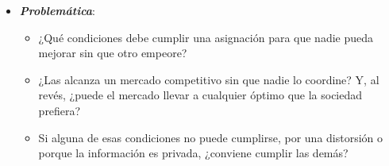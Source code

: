 \documentclass[11pt]{article}
\begin{document}
\begin{itemize}
\begin{itemize}
\begin{itemize}
    \item En los años 50, \textcite{LipseyLancaster1956General} formalizan el \emph{second best}, anticipado por \textcite{Meade1955Trade}, y desde los 70~la economía de la información (, ) muestra los límites de los teoremas cuando la información es privada.\footnote{ recibió el Premio Nobel de Economía en 1977, con , «por su contribución pionera a la teoría del comercio internacional y de los movimientos internacionales de capital»\nocite{Nobel1977MeadeOhlin}; , en 1996, con , «por sus contribuciones fundamentales a la teoría económica de los incentivos con información asimétrica»\nocite{Nobel1996MirrleesVickrey}, y , en 2007, con  y , «por haber sentado las bases de la teoría del diseño de mecanismos»\nocite{Nobel2007HurwiczMaskinMyerson}.}
    \end{itemize}
  \item \emph{Desde un punto de vista teórico}, el tema completa el equilibrio general : aquel pregunta si existe un equilibrio competitivo, si es único y si es estable; este pregunta si es bueno.
  \end{itemize}

\item \textbf{\emph{Problemática}}:
  \begin{itemize}
  \item ¿Qué condiciones debe cumplir una asignación para que nadie pueda mejorar sin que otro empeore?
  \item ¿Las alcanza un mercado competitivo sin que nadie lo coordine? Y, al revés, ¿puede el mercado llevar a cualquier óptimo que la sociedad prefiera?
  \item Si alguna de esas condiciones no puede cumplirse, por una distorsión o porque la información es privada, ¿conviene cumplir las demás?
  \end{itemize}


\end{itemize}
\end{document}
